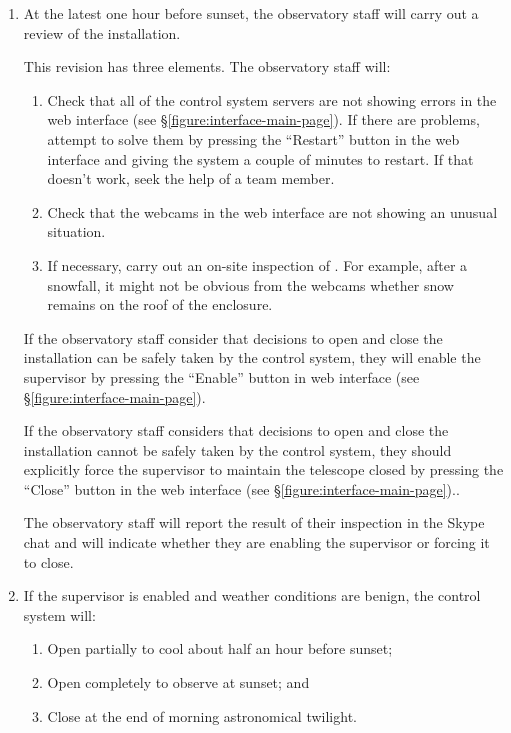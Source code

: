 \begin{enumerate}

\item At the latest one hour before sunset, the observatory staff will carry out a review of the {\projectname} installation. 

This revision has three elements. The observatory staff will:

\begin{enumerate}
\item
Check that all of the control system servers are not showing errors in the web interface (see \S\ref{figure:interface-main-page}). If there are problems, attempt to solve them by pressing the “Restart” button in the web interface and giving the system a couple of minutes to restart. If that doesn't work, seek the help of a team member.
\item
Check that the webcams in the web interface are not showing an unusual situation.
\item
If necessary, carry out an on-site inspection of {\projectname}. For example, after a snowfall, it might not be obvious from the webcams whether snow remains on the roof of the enclosure.
\end{enumerate}

If the observatory staff consider that decisions to open and close the installation can be safely taken by the control system, they will enable the supervisor by pressing the “Enable” button in web interface (see \S\ref{figure:interface-main-page}).

If the observatory staff considers that decisions to open and close the installation cannot be safely taken by the control system, they should explicitly force the supervisor to maintain the telescope closed by pressing the “Close” button in  the web interface (see \S\ref{figure:interface-main-page}).. 

The observatory staff will report the result of their inspection in the Skype chat and will indicate whether they are enabling the supervisor or forcing it to close.

\item
If the supervisor is enabled and weather conditions are benign, the control system will:
\begin{enumerate}
\item
Open partially to cool about half an hour before sunset;
\item
Open completely to observe at sunset; and
\item
Close at the end of morning astronomical twilight.
\end{enumerate}


\end{enumerate}
